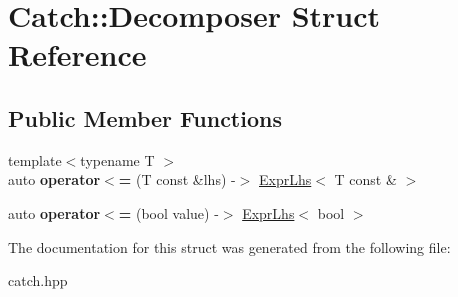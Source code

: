 \hypertarget{structCatch_1_1Decomposer}{}\section{Catch\+::Decomposer Struct Reference}
\label{structCatch_1_1Decomposer}
\subsection*{Public Member Functions}
\begin{DoxyCompactItemize}
\item 
\mbox{\label{structCatch_1_1Decomposer_a4b1e5e844c20e5a90e3d759d216674cd}} 
{\footnotesize template$<$typename T $>$ }\\auto {\bfseries operator$<$=} (T const \&lhs) -\/$>$ \mbox{\hyperlink{classCatch_1_1ExprLhs}{Expr\+Lhs}}$<$ T const \& $>$
\item 
\mbox{\label{structCatch_1_1Decomposer_aac129b94903ae1339d5709049d83613b}} 
auto {\bfseries operator$<$=} (bool value) -\/$>$ \mbox{\hyperlink{classCatch_1_1ExprLhs}{Expr\+Lhs}}$<$ bool $>$
\end{DoxyCompactItemize}


The documentation for this struct was generated from the following file\+:\begin{DoxyCompactItemize}
\item 
catch.\+hpp\end{DoxyCompactItemize}
